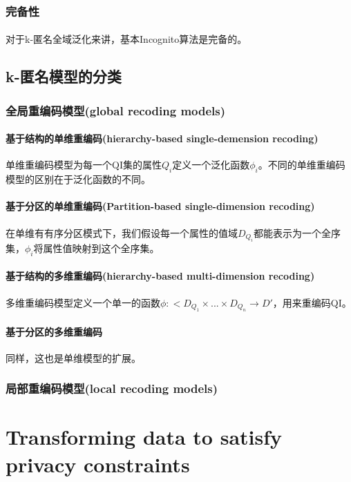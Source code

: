 \documentclass[12pt,a4paper]{article}
\begin{document}
\subsubsection{完备性}
\paragraph{} 对于k-匿名全域泛化来讲，基本Incognito算法是完备的。

\subsection{k-匿名模型的分类}
\subsubsection{全局重编码模型(global recoding models)}

\paragraph{基于结构的单维重编码(hierarchy-based single-demension recoding)} 单维重编码模型为每一个QI集的属性$Q_i$定义一个泛化函数$\phi_i$。不同的单维重编码模型的区别在于泛化函数的不同。

\paragraph{基于分区的单维重编码(Partition-based single-dimension recoding)} 在单维有有序分区模式下，我们假设每一个属性的值域$D_{Q_i}$都能表示为一个全序集，$\phi_i$将属性值映射到这个全序集。

\paragraph{基于结构的多维重编码(hierarchy-based multi-dimension recoding)} 多维重编码模型定义一个单一的函数$\phi: <D_{Q_1} \times ... \times D_{Q_n} \rightarrow D'$，用来重编码QI。

\paragraph{基于分区的多维重编码} 同样，这也是单维模型的扩展。


\subsubsection{局部重编码模型(local recoding models)}

\section{Transforming data to satisfy privacy constraints\cite{iyengar2002} }
\end{document}
